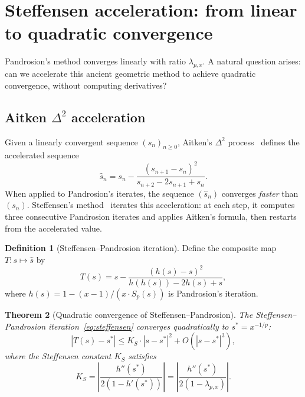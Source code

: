 \documentclass[10pt,a4paper,oneside]{book}
\newtheorem{theorem}{Theorem}[chapter]
\theoremstyle{definition}
\newtheorem{definition}[theorem]{Definition}
\theoremstyle{remark}
\begin{document}
\section{Steffensen acceleration: from linear to quadratic convergence}
\label{sec:steffensen}

Pandrosion's method converges linearly with ratio $\lambda_{p,x}$. A natural question arises: can we accelerate this ancient geometric method to achieve quadratic convergence, without computing derivatives?

\subsection{Aitken \texorpdfstring{$\Delta^2$}{Delta-squared} acceleration}

Given a linearly convergent sequence $(s_n)_{n \geq 0}$, Aitken's $\Delta^2$ process~\cite{stoer} defines the accelerated sequence
\[
  \hat{s}_n = s_n - \frac{(s_{n+1} - s_n)^2}{s_{n+2} - 2s_{n+1} + s_n}.
\]
When applied to Pandrosion's iterates, the sequence $(\hat{s}_n)$ converges \emph{faster} than $(s_n)$. Steffensen's method~\cite{steffensen} iterates this acceleration: at each step, it computes three consecutive Pandrosion iterates and applies Aitken's formula, then restarts from the accelerated value.

\begin{definition}[Steffensen--Pandrosion iteration]
\label{def:steffensen}
Define the composite map $T : s \mapsto \hat{s}$ by
\begin{equation}
  \label{eq:steffensen}
  T(s) = s - \frac{(h(s) - s)^2}{h(h(s)) - 2h(s) + s},
\end{equation}
where $h(s) = 1 - (x-1)/(x \cdot S_p(s))$ is Pandrosion's iteration.
\end{definition}

\begin{theorem}[Quadratic convergence of Steffensen--Pandrosion]
\label{thm:steffensen}
The Steffensen--Pandrosion iteration~\eqref{eq:steffensen} converges \emph{quadratically} to $s^* = x^{-1/p}$:
\[
  |T(s) - s^*| \leq K_S \cdot |s - s^*|^2 + O(|s - s^*|^3),
\]
where the Steffensen constant $K_S$ satisfies
\begin{equation}
  \label{eq:K_steffensen}
  K_S = \left|\frac{h''(s^*)}{2(1 - h'(s^*))}\right| = \left|\frac{h''(s^*)}{2(1 - \lambda_{p,x})}\right|.
\end{equation}
\end{theorem}
\end{document}
